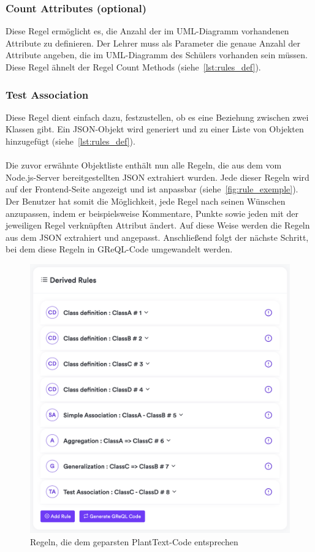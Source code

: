 \subsubsection{Count Attributes (optional)}
Diese Regel ermöglicht es, die Anzahl der im UML-Diagramm vorhandenen Attribute zu definieren. Der Lehrer muss als
Parameter die genaue Anzahl der Attribute angeben, die im UML-Diagramm des Schülers vorhanden sein müssen. Diese Regel
ähnelt der Regel Count Methods (siehe~\ref{lst:rules_def}).

\subsubsection{Test Association}
Diese Regel dient einfach dazu, festzustellen, ob es eine Beziehung zwischen zwei Klassen gibt. Ein JSON-Objekt wird
generiert und zu einer Liste von Objekten hinzugefügt (siehe~\ref{lst:rules_def}).
\\~\\
Die zuvor erwähnte Objektliste enthält nun alle Regeln, die aus dem vom Node.js-Server bereitgestellten JSON extrahiert
wurden. Jede dieser Regeln wird auf der Frontend-Seite angezeigt und ist anpassbar (siehe~\ref{fig:rule_exemple}).
Der Benutzer hat somit die Möglichkeit, jede Regel nach seinen Wünschen anzupassen, indem er beispielsweise Kommentare,
Punkte sowie jeden mit der jeweiligen Regel verknüpften Attribut ändert. Auf diese Weise werden die Regeln aus dem JSON
extrahiert und angepasst. Anschließend folgt der nächste Schritt, bei dem diese Regeln in GReQL-Code umgewandelt werden.

\begin{figure}[!h]
    \centering
    \includegraphics[width=16cm]{images/extracted_rules}
    \caption{Regeln, die dem geparsten PlantText-Code entsprechen}
    \label{fig:extracted_rules}
\end{figure}

